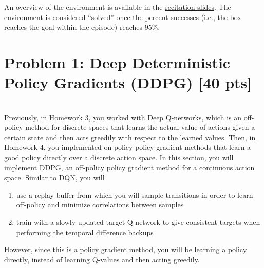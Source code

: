 \documentclass[12pt]{article}
\begin{document}
An overview of the environment is available in the \href{https://docs.google.com/presentation/d/1ueiyyXN_v7h_4GGa4NtMBau0Du1wpZstS3pfJIds37U/edit?usp=sharing}{recitation slides}.  The environment is considered ``solved'' once the percent successes (i.e., the box reaches the goal within the episode) reaches $95\%$. 



\section*{Problem 1: Deep Deterministic Policy Gradients (DDPG) \textbf{[40 pts]}}
\ \\


Previously, in Homework 3, you worked with Deep Q-networks, which is an off-policy method for discrete spaces that learns the actual value of actions given a certain state and then acts greedily with respect to the learned values.  Then, in Homework 4, you implemented on-policy policy gradient methods that learn a good policy directly over a discrete action space.  In this section, you will implement DDPG, an off-policy policy gradient method for a continuous action space.  Similar to DQN, you will 
\begin{enumerate}
    \item use a replay buffer from which you will sample transitions in order to learn off-policy and minimize correlations between samples
    \item train with a slowly updated target Q network to give consistent targets when performing the temporal difference backups
\end{enumerate}
However, since this is a policy gradient method, you will be learning a policy directly, instead of learning Q-values and then acting greedily.
\end{document}

